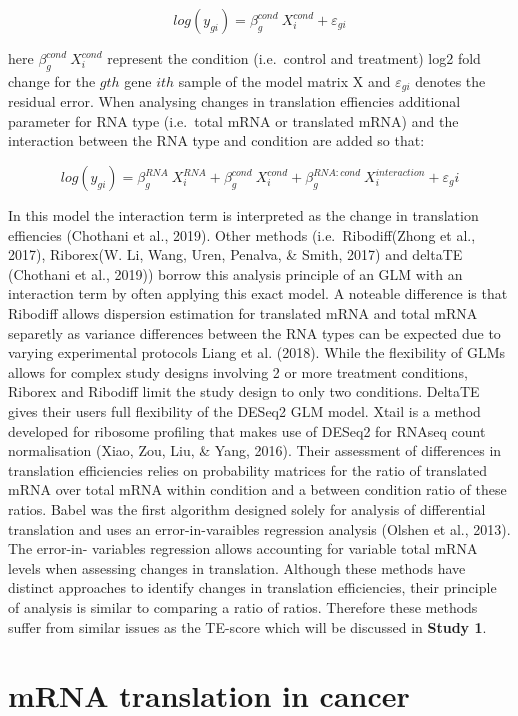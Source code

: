 \documentclass[
  12pt,
  openany]{book}
\begin{document}
\[log(y_{gi}) = \beta_g^{cond}\ X_i^{cond} + \varepsilon_{gi}\]

here \(\beta_g^{cond}\ X_i^{cond}\) represent the condition (i.e.~control and treatment) log2 fold change for the \(gth\) gene \(ith\) sample of the model matrix X and \(\varepsilon_{gi}\) denotes the residual error. When analysing changes in translation effiencies additional parameter for RNA type (i.e.~total mRNA or translated mRNA) and the interaction between the RNA type and condition are added so that:

\[log(y_{gi}) = \beta_g^{RNA}\ X_i^{RNA}+ \beta_g^{cond}\ X_i^{cond} + \beta_g^{RNA:cond}\ X_i^{interaction} + \varepsilon_gi\]

In this model the interaction term is interpreted as the change in translation effiencies (Chothani et al., 2019). Other methods (i.e.~Ribodiff(Zhong et al., 2017), Riborex(W. Li, Wang, Uren, Penalva, \& Smith, 2017) and deltaTE (Chothani et al., 2019)) borrow this analysis principle of an GLM with an interaction term by often applying this exact model. A noteable difference is that Ribodiff allows dispersion estimation for translated mRNA and total mRNA separetly as variance differences between the RNA types can be expected due to varying experimental protocols Liang et al. (2018). While the flexibility of GLMs allows for complex study designs involving 2 or more treatment conditions, Riborex and Ribodiff limit the study design to only two conditions. DeltaTE gives their users full flexibility of the DESeq2 GLM model. Xtail is a method developed for ribosome profiling that makes use of DESeq2 for RNAseq count normalisation (Xiao, Zou, Liu, \& Yang, 2016). Their assessment of differences in translation efficiencies relies on probability matrices for the ratio of translated mRNA over total mRNA within condition and a between condition ratio of these ratios. Babel was the first algorithm designed solely for analysis of differential translation and uses an error-in-varaibles regression analysis (Olshen et al., 2013). The error-in- variables regression allows accounting for variable total mRNA levels when assessing changes in translation. Although these methods have distinct approaches to identify changes in translation efficiencies, their principle of analysis is similar to comparing a ratio of ratios. Therefore these methods suffer from similar issues as the TE-score which will be discussed in \textbf{Study 1}.

\section{mRNA translation in cancer}
\end{document}
